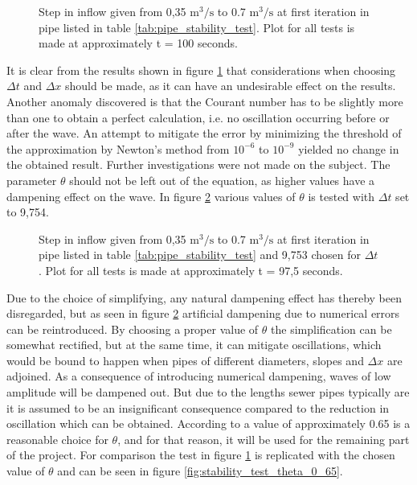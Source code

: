 \begin{figure}[H]
 \centering
 
\caption{Step in inflow given from 0,35 $\text{m}^\text{3}/ \text{s}$ to 0.7 $\text{m}^\text{3}/ \text{s}$ at first iteration in pipe listed in table \ref{tab:pipe_stability_test}. Plot for all tests is made at approximately t = 100 seconds.}
\label{fig:stability_test_theta_0_5}
\end{figure}

It is clear from the results shown in figure \ref{fig:stability_test_theta_0_5} that considerations when choosing $\Delta t$ and $\Delta x$ should be made, as it can have an undesirable effect on the results. Another anomaly discovered is that the Courant number has to be slightly more than one to obtain a perfect calculation, i.e. no oscillation occurring before or after the wave. An attempt to mitigate the error by minimizing the threshold of the approximation by Newton's method from $10^{-6}$ to $10^{-9}$ yielded no change in the obtained result. Further investigations were not made on the subject.
The parameter $\theta$ should not be left out of the equation, as higher values have a dampening effect on the wave. In figure \ref{fig:stability_theta_test_05_065_1} various values of $\theta$ is tested  with $\Delta t$ set to 9,754.    

\begin{figure}[H]
 \centering
 
\caption{Step in inflow given from 0,35 $\text{m}^\text{3}/ \text{s}$ to 0.7 $\text{m}^\text{3}/ \text{s}$ at first iteration in pipe listed in table \ref{tab:pipe_stability_test} and 9,753 chosen for $\Delta t$ . Plot for all tests is made at approximately t = 97,5 seconds.}
\label{fig:stability_theta_test_05_065_1}
\end{figure}

Due to the choice of simplifying, any natural dampening effect has thereby been disregarded, but as seen in figure \ref{fig:stability_theta_test_05_065_1} artificial dampening due to numerical errors can be reintroduced. By choosing a proper value of $\theta$ the simplification can be somewhat rectified, but at the same time, it can mitigate oscillations, which would be bound to happen when pipes of different diameters, slopes and $\Delta x$ are adjoined. As a consequence of introducing numerical dampening, waves of low amplitude will be dampened out. But due to the lengths sewer pipes typically are it is assumed to be an insignificant consequence compared to the reduction in oscillation which can be obtained. According to \cite{cunge1980practical} a value of approximately 0.65 is a reasonable choice for $\theta$, and for that reason, it will be used for the remaining part of the project. For comparison the test in figure \ref{fig:stability_test_theta_0_5} is replicated with the chosen value of $\theta$ and can be seen in figure \ref{fig:stability_test_theta_0_65}.

